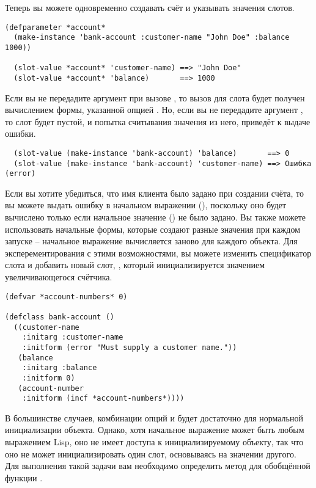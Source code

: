 Теперь вы можете одновременно создавать счёт и указывать значения слотов.

\begin{lstlisting}
(defparameter *account*
  (make-instance 'bank-account :customer-name "John Doe" :balance 1000))

  (slot-value *account* 'customer-name) ==> "John Doe"
  (slot-value *account* 'balance)       ==> 1000
\end{lstlisting}

Если вы не передадите аргумент  при вызове , то вызов
 для слота  будет получен вычислением формы, указанной
опцией .  Но, если вы не передадите аргумент , то
слот  будет пустой, и попытка считывания значения из него, приведёт к
выдаче ошибки.

\begin{verbatim}
  (slot-value (make-instance 'bank-account) 'balance)       ==> 0
  (slot-value (make-instance 'bank-account) 'customer-name) ==> Ошибка (error)
\end{verbatim}

Если вы хотите убедиться, что имя клиента было задано при создании счёта, то вы можете
выдать ошибку в начальном выражении (), поскольку оно будет вычислено
только если начальное значение () не было задано.  Вы также можете
использовать начальные формы, которые создают разные значения при каждом запуске --
начальное выражение вычисляется заново для каждого объекта.  Для эксперементирования с
этими возможностями, вы можете изменить спецификатор слота  и добавить
новый слот, , который инициализируется значением увеличивающегося
счётчика.

\begin{lstlisting}
(defvar *account-numbers* 0)

(defclass bank-account ()
  ((customer-name
    :initarg :customer-name
    :initform (error "Must supply a customer name."))
   (balance
    :initarg :balance
    :initform 0)
   (account-number
    :initform (incf *account-numbers*))))
\end{lstlisting}

В большинстве случаев, комбинации опций  и  будет
достаточно для нормальной инициализации объекта.  Однако, хотя начальное выражение может
быть любым выражением Lisp, оно не имеет доступа к инициализируемому объекту, так что оно
не может инициализировать один слот, основываясь на значении другого.  Для выполнения
такой задачи вам необходимо определить метод для обобщённой функции
.

